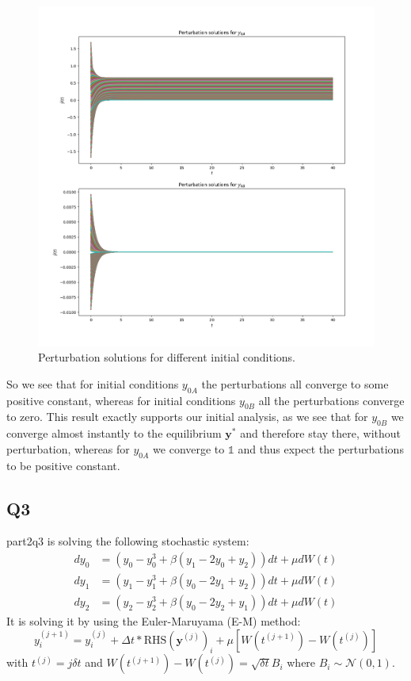 \documentclass[a4paper, oneside]{book}
\begin{document}
\begin{figure}[htpb]
    \centering
    \includegraphics[width=1.0\textwidth]{./images/perturbation_solutions.png}
    \caption{Perturbation solutions for different initial conditions.}
\end{figure}
So we see that for initial conditions $y_{0A}$ the perturbations all converge to some
positive constant, whereas for initial conditions $y_{0B}$ all the perturbations converge to zero.
This result exactly supports our initial analysis, as we see that for $y_{0B}$ we converge almost
instantly to the equilibrium $\mathbf{y}^*$ and therefore stay there, without perturbation, whereas for $y_{0A}$ we converge to $\mathbb{1}$ and thus expect the perturbations to be positive constant.

\subsection*{Q3}
part2q3 is solving the following stochastic system:
\begin{align}
dy_{0} &= (y_{0} - y_{0}^{3} + \beta(y_{1} - 2 y_{0} + y_{2})) dt + \mu dW(t) \\
dy_{1} &= (y_{1} - y_{1}^{3} + \beta(y_{0} - 2 y_{1} + y_{2})) dt + \mu dW(t) \\
dy_{2} &= (y_{2} - y_{2}^{3} + \beta(y_{0} - 2 y_{2} + y_{1})) dt + \mu dW(t)
\end{align}
It is solving it by using the Euler-Maruyama (E-M) method:
$$
y_{i}^{(j+1)} = y_{i}^{(j)} + \Delta t * \text{RHS}(\mathbf{y}^{(j)})_{i} + \mu [W(t^{(j+1)}) - W(t^{(j)})]
$$
with $t^{(j)} = j \delta t$ and $W(t^{(j+1)}) - W(t^{(j)}) =  \sqrt{ \delta t } B_{i}$ where $B_{i} \sim \mathcal{N}(0, 1)$.
\end{document}
